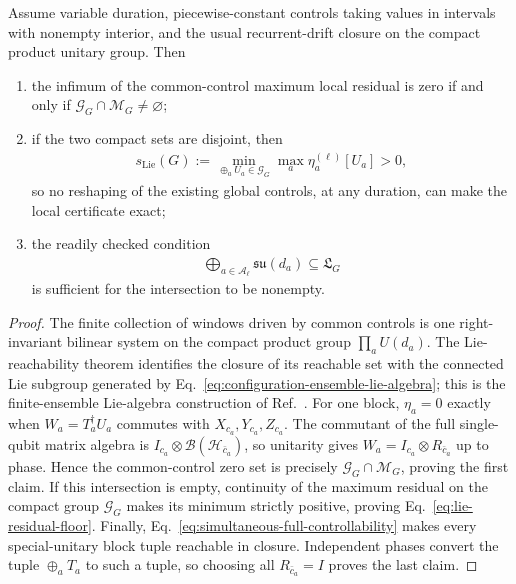 \begin{proposition}
\label{prop:ensemble-controllability-gate}
Assume variable duration, piecewise-constant controls taking values in
intervals with nonempty interior, and the usual recurrent-drift closure on
the compact product unitary group.  Then
\begin{enumerate}
\item the infimum of the common-control maximum local residual is zero if and
only if $\mathscr G_G\cap\mathscr M_G\neq\varnothing$;
\item if the two compact sets are disjoint, then
\begin{align}
s_{\mathrm{Lie}}(G)
:=\min_{\oplus_a U_a\in\mathscr G_G}
\max_a\eta_a^{(\ell)}[U_a]>0,
\label{eq:lie-residual-floor}
\end{align}
so no reshaping of the existing global controls, at any duration, can make
the local certificate exact;
\item the readily checked condition
\begin{align}
\bigoplus_{a\in\mathcal A_\ell}\mathfrak{su}(d_a)
\subseteq\mathfrak L_G
\label{eq:simultaneous-full-controllability}
\end{align}
is sufficient for the intersection to be nonempty.
\end{enumerate}
\end{proposition}

\begin{proof}
The finite collection of windows driven by common controls is one
right-invariant bilinear system on the compact product group
$\prod_a U(d_a)$.  The Lie-reachability theorem identifies the closure of its
reachable set with the connected Lie subgroup generated by
Eq.~\eqref{eq:configuration-ensemble-lie-algebra}; this is the finite-ensemble
Lie-algebra construction of Ref.~\cite{agrachev_2016_ensemble}.
For one block, $\eta_a=0$ exactly when
$W_a=T_a^\dagger U_a$ commutes with $X_{c_a},Y_{c_a},Z_{c_a}$.  The commutant
of the full single-qubit matrix algebra is
$I_{c_a}\otimes\mathcal B(\mathcal H_{\bar c_a})$, so unitarity gives
$W_a=I_{c_a}\otimes R_{\bar c_a}$ up to phase.  Hence the common-control
zero set is precisely $\mathscr G_G\cap\mathscr M_G$, proving the first
claim.  If this intersection is empty, continuity of the maximum residual on
the compact group $\mathscr G_G$ makes its minimum strictly positive, proving
Eq.~\eqref{eq:lie-residual-floor}.  Finally,
Eq.~\eqref{eq:simultaneous-full-controllability} makes every special-unitary
block tuple reachable in closure.  Independent phases convert the tuple
$\oplus_aT_a$ to such a tuple, so choosing all $R_{\bar c_a}=I$ proves the
last claim.
\end{proof}

